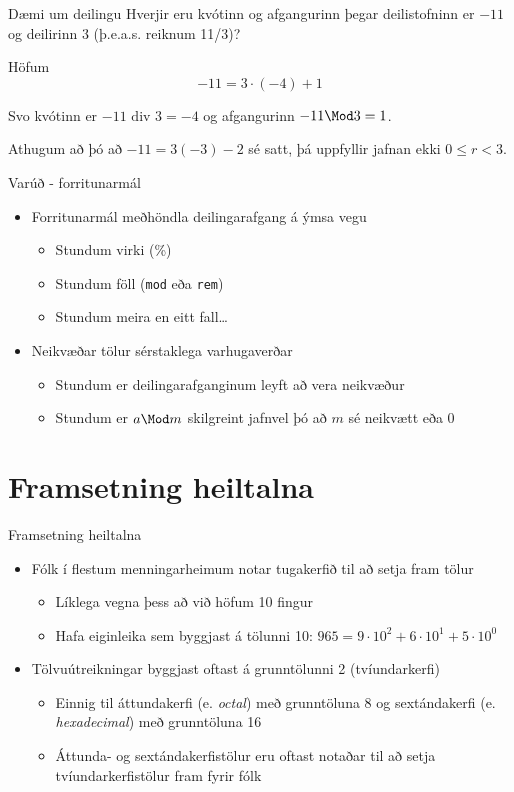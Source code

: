 \documentclass{beamer}
\begin{document}
\begin{frame}{Dæmi um deilingu}
Hverjir eru kvótinn og afgangurinn þegar deilistofninn er $-11$ og deilirinn $3$ (þ.e.a.s. reiknum 11/3)? \pause

Höfum
\[
 -11 = 3 \cdot (-4) + 1
\]

Svo kvótinn er $-11 \text{ div } 3 = -4$ og afgangurinn $-11 \Mod 3 = 1$.

\vspace{0.5cm}
Athugum að þó að $-11 = 3(-3) - 2$ sé satt, þá uppfyllir jafnan ekki $0 \leq r < 3$.
\end{frame}

\begin{frame}{Varúð - forritunarmál}
\begin{itemize}
 \item Forritunarmál meðhöndla deilingarafgang á ýmsa vegu
 \begin{itemize}
  \item Stundum virki (\%)
  \item Stundum föll (\texttt{mod} eða \texttt{rem})
  \item Stundum meira en eitt fall\ldots
 \end{itemize}
 \item Neikvæðar tölur sérstaklega varhugaverðar
 \begin{itemize}
  \item Stundum er deilingarafganginum leyft að vera neikvæður
  \item Stundum er $a \Mod m$ skilgreint jafnvel þó að $m$ sé neikvætt eða 0
 \end{itemize}
\end{itemize}
\end{frame}

\section{Framsetning heiltalna}

\begin{frame}{Framsetning heiltalna}
\begin{itemize}
 \item Fólk í flestum menningarheimum notar tugakerfið til að setja fram tölur
 \begin{itemize}
  \item Líklega vegna þess að við höfum 10 fingur
  \item Hafa eiginleika sem byggjast á tölunni 10: $965 = 9\cdot10^2+6\cdot10^1+5\cdot10^0$
 \end{itemize}
 \item Tölvuútreikningar byggjast oftast á grunntölunni 2 (tvíundarkerfi)
 \begin{itemize}
  \item Einnig til áttundakerfi (e. \emph{octal}) með grunntöluna 8 og sextándakerfi (e. \emph{hexadecimal}) með grunntöluna 16
  \item Áttunda- og sextándakerfistölur eru oftast notaðar til að setja tvíundarkerfistölur fram fyrir fólk
 \end{itemize}
\end{itemize}
\end{frame}
\end{document}
